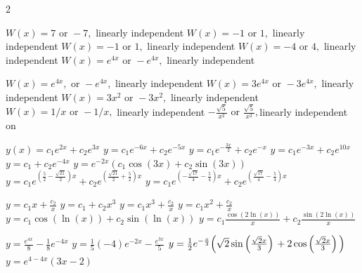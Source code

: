  \begin{multicols}{2}\scriptsize
 	\begin{Answer}[ref={EX32}]
 		
\Question \label{3-2-1a} 	
		\begin{tasks}
			\task \(W(x) =7 \mbox{ or } -7,\) linearly independent
			\task \(W(x) =-1 \mbox{ or } 1,\) linearly independent
			\task \(W(x) =-1 \mbox{ or } 1,\) linearly independent
			\task \(W(x) =-4 \mbox{ or } 4,\) linearly independent
			\task \(W(x) =e^{4x} \mbox{ or } -e^{4x},\) linearly independent
			
			\task \(W(x) =e^{4x},\mbox{ or } -e^{4x},\) linearly independent
			\task \(W(x) =3e^{4x}\mbox{ or } -3e^{4x},\) linearly independent
			\task \(W(x) =3x^2 \mbox{ or }-3x^2,\) linearly independent
			\task \(W(x) =1/x \mbox{ or } -1/x,\) linearly independent
			\task \(-\frac{\sqrt{5}}{x^2}  \mbox{ or } \frac{\sqrt{5}}{x^2},\)linearly independent on 
		\end{tasks}
\Question \label{3-2-2a} 	
\begin{tasks}
	\task \(y(x)=c_1 e^{2 x}+c_2 e^{3 x}\)
	\task \(y=c_1 e^{-6 x}+c_2 e^{-5 x}\)
	\task \(y=c_1 e^{-\frac{3 x}{2}}+c_2 e^{-x}\)
	\task \(y=c_1 e^{-3 x}+c_2 e^{10 x}\)
	\task \(y=c_1+ c_2 e^{-4 x}\)
	\task \(y=e^{-2 x} (c_1 \cos (3 x)+c_2  \sin (3 x))\)
	\task \(y=c_1 e^{\left(\frac{5}{2}-\frac{\sqrt{21}}{2}\right) x}+c_2 e^{\left(\frac{\sqrt{21}}{2}+\frac{5}{2}\right) x}\)
	\task \(y=c_1 e^{\left(-\frac{\sqrt{17}}{4}-\frac{5}{4}\right) x}+c_2 e^{\left(\frac{\sqrt{17}}{4}-\frac{5}{4}\right) x}\)
	
\end{tasks}

\Question \label{3-2-3a}
\begin{tasks}
	\task \(y = c_1 x+\frac{c_2}{x}\)
	\task \(y =c_1+c_2 x^3\)
	\task \(y = c_1 x^3+\frac{c_2}{x}\)
	\task \(y =c_1 x^2+\frac{c_2}{x}\)
	\task \(y= c_1 \cos (\ln (x))+c_2 \sin (\ln (x))\)
	\task \(y = c_1\frac{\cos (2 \ln (x))}{x}+c_2\frac{\sin (2 \ln (x))}{x} \)
\end{tasks}
\Question \label{3-2-4a}
\begin{tasks}
	\task \(y=\frac{e^{4 x}}{8}-\frac{1}{8} e^{-4 x}\)
	\task \(y =\frac{1}{5} (-4) e^{-2 x}-\frac{e^{3 x}}{5}\)
	\task \(y=\frac{1}{2} e^{-\frac{x}{3}} \Big(\sqrt{2} \sin \left(\frac{\sqrt{2} x}{3}\right)\\
	+2 \cos \left(\frac{\sqrt{2} x}{3}\right)\Big)\)
	\task \(y=e^{4-4 x} (3 x-2)\)
\end{tasks}


\end{Answer}
\end{multicols}
